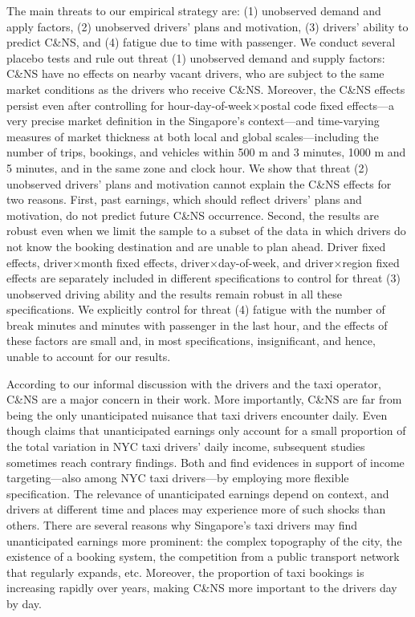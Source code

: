 \documentclass[reviewmode]{restat}
\begin{document}
The main threats to our empirical strategy are: (1) unobserved demand and apply factors, (2) unobserved drivers' plans and motivation, (3) drivers' ability to predict C\&NS, and (4) fatigue due to time with passenger.
We conduct several placebo tests and rule out threat (1) unobserved demand and supply factors: C\&NS have no effects on nearby vacant drivers, who are subject to the same market conditions as the drivers who receive C\&NS. Moreover, the C\&NS effects persist even after controlling for hour-day-of-week\(\times\)postal code fixed effects---a very precise market definition in the Singapore's context---and time-varying measures of market thickness at both local and global scales---including the number of trips, bookings, and vehicles within 500 m and 3 minutes, 1000 m and 5 minutes, and in the same zone and clock hour. We show that threat (2) unobserved drivers' plans and motivation cannot explain the C\&NS effects for two reasons. First, past earnings, which should reflect drivers' plans and motivation, do not predict future C\&NS occurrence. Second, the results are robust even when we limit the sample to a subset of the data in which drivers do not know the booking destination and are unable to plan ahead. Driver fixed effects, driver\(\times\)month fixed effects, driver\(\times\)day-of-week, and driver\(\times\)region fixed effects are separately included in different specifications to control for threat (3) unobserved driving ability and the results remain robust in all these specifications. We explicitly control for threat (4) fatigue with the number of break minutes and minutes with passenger in the last hour, and the effects of these factors are small and, in most specifications, insignificant, and hence, unable to account for our results.



According to our informal discussion with the drivers and the taxi 
operator,  C\&NS are a major concern in their work. 
More importantly, C\&NS are far from being the only unanticipated nuisance that 
taxi drivers encounter daily. Even though \cite{farber2015you} claims that  unanticipated earnings only
account for a small proportion of the total variation in NYC taxi drivers' daily income, subsequent 
studies sometimes reach contrary findings. Both \cite{thakral2018daily} and \cite{martin2017quit} 
find evidences in support of income targeting---also among NYC taxi drivers---by employing more flexible
specification. The relevance of unanticipated earnings depend on context, and drivers at different time 
and places may experience more of such shocks than others. There are several reasons why 
Singapore's taxi drivers may find unanticipated earnings more prominent: the complex topography of 
the city, the existence of a booking system, the competition from a public transport network that 
regularly expands, etc. Moreover, the proportion of taxi bookings is increasing rapidly over years, 
making C\&NS more important to the drivers day by day. 
\end{document}
